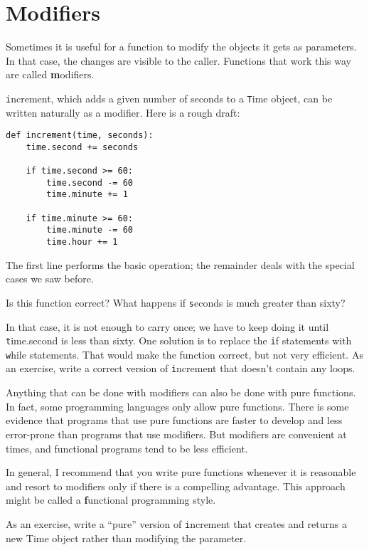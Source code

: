 \documentclass[
DIV=11,
fontsize=12,
twoside,
headinclude=false,
titlepage=firstiscover,
abstract=true,
headsepline=true,
footsepline=true,
chapterprefix=true, %
headings=big,
bibliography=totoc,%
captions=tableheading
]{scrbook}
\theoremstyle{definition}
\begin{document}
\section{Modifiers}
\label{increment}

Sometimes it is useful for a function to modify the objects it gets as
parameters.  In that case, the changes are visible to the caller.
Functions that work this way are called {\textbf modifiers}.

{\texttt increment}, which adds a given number of seconds to a {\texttt Time}
object, can be written naturally as a
modifier.  Here is a rough draft:

\begin{lstlisting}
def increment(time, seconds):
    time.second += seconds

    if time.second >= 60:
        time.second -= 60
        time.minute += 1

    if time.minute >= 60:
        time.minute -= 60
        time.hour += 1
\end{lstlisting}
%
The first line performs the basic operation; the remainder deals
with the special cases we saw before.

Is this function correct?  What happens if {\texttt seconds}
is much greater than sixty?  

In that case, it is not enough to carry once; we have to keep doing it
until {\texttt time.second} is less than sixty.  One solution is to
replace the {\texttt if} statements with {\texttt while} statements.  That
would make the function correct, but not very efficient.  As an
exercise, write a correct version of {\texttt increment} that doesn't
contain any loops.

Anything that can be done with modifiers can also be done with pure
functions.  In fact, some programming languages only allow pure
functions.  There is some evidence that programs that use pure
functions are faster to develop and less error-prone than programs
that use modifiers.  But modifiers are convenient at times,
and functional programs tend to be less efficient.

In general, I recommend that you write pure functions whenever it is
reasonable and resort to modifiers only if there is a compelling
advantage.  This approach might be called a {\textbf functional
programming style}.

As an exercise, write a ``pure'' version of {\texttt increment} that
creates and returns a new Time object rather than modifying the
parameter.
\end{document}
